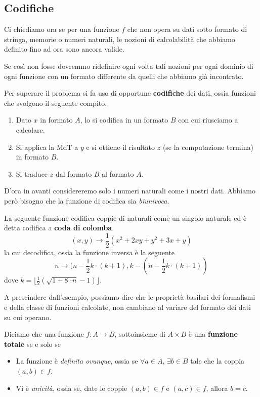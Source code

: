 \subsection{Codifiche}
Ci chiediamo ora se per una funzione $f$ che non opera su
dati sotto formato di stringa, memorie o numeri naturali,
le nozioni di calcolabilità che abbiamo definito fino ad ora
sono ancora valide.

Se così non fosse dovremmo ridefinire ogni volta tali nozioni
per ogni dominio di ogni funzione con un formato differente da
quelli che abbiamo già incontrato.

Per superare il problema si fa uso di opportune
\textbf{codifiche} dei dati, ossia funzioni che svolgono
il seguente compito.
\begin{enumerate}
	\item Dato $x$ in formato $A$, lo si codifica in un formato
	      $B$ con cui riusciamo a calcolare.
	\item Si applica la MdT a $y$ e si ottiene il risultato $z$
	      (se la computazione termina) in formato $B$.
	\item Si traduce $z$ dal formato $B$ al formato $A$.
\end{enumerate}
D'ora in avanti considereremo solo i numeri naturali come i
nostri dati. Abbiamo però bisogno che la funzione di codifica
sia \emph{biunivoca}.

\begin{example}
	La seguente funzione codifica coppie di naturali come un
	singolo naturale ed è detta codifica a
	\textbf{coda di colomba}.
	\[ (x, y) \to \frac{1}{2} (x^2 + 2 x y + y^2 + 3 x + y) \]
	la cui decodifica, ossia la funzione inversa è la seguente
	\[
		n \to (n - \frac{1}{2} k \cdot (k + 1),
		k - (n - \frac{1}{2} k \cdot (k + 1))
	\]
	dove $k=\lfloor \frac{1}{2}(\sqrt{1+8\cdot n}-1)\rfloor$.
\end{example}

A prescindere dall'esempio, possiamo dire che le proprietà
basilari dei formalismi e della classe di funzioni calcolate,
non cambiano al variare del formato dei dati su cui operano.

\begin{definition}
	Diciamo che una funzione $f : A \to B$, sottoinsieme di
	$A \times B$ è una \textbf{funzione totale} se e solo se
	\begin{itemize}
		\item La funzione è \emph{definita ovunque}, ossia se
		      $\forall a \in A$, $\exists b \in B$ tale che la
		      coppia $(a, b) \in f$.
		\item Vi è \emph{unicità}, ossia se, date le coppie
		      $(a, b) \in f$ e $(a, c) \in f$, allora $b=c$.
	\end{itemize}
\end{definition}

